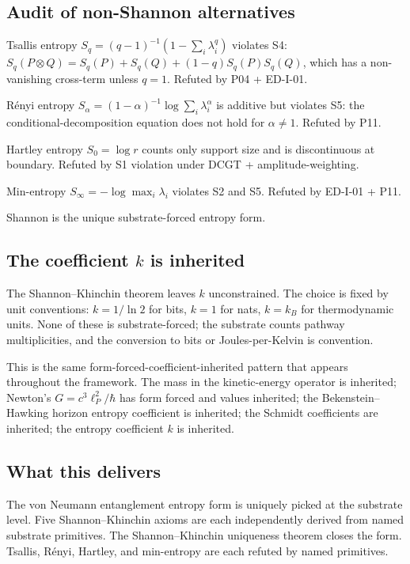 \documentclass[11pt,a4paper]{article}
\begin{document}
\subsection{Audit of non-Shannon alternatives}

Tsallis entropy $S_q = (q-1)^{-1}(1 - \sum_i \lambda_i^q)$ violates S4: $S_q(P \otimes Q) = S_q(P) + S_q(Q) + (1-q) S_q(P) S_q(Q)$, which has a non-vanishing cross-term unless $q = 1$. Refuted by P04 + ED-I-01.

R\'enyi entropy $S_\alpha = (1-\alpha)^{-1} \log \sum_i \lambda_i^\alpha$ is additive but violates S5: the conditional-decomposition equation does not hold for $\alpha \neq 1$. Refuted by P11.

Hartley entropy $S_0 = \log r$ counts only support size and is discontinuous at boundary. Refuted by S1 violation under DCGT + amplitude-weighting.

Min-entropy $S_\infty = -\log \max_i \lambda_i$ violates S2 and S5. Refuted by ED-I-01 + P11.

Shannon is the unique substrate-forced entropy form.

\subsection{The coefficient $k$ is inherited}

The Shannon--Khinchin theorem leaves $k$ unconstrained. The choice is fixed by unit conventions: $k = 1/\ln 2$ for bits, $k = 1$ for nats, $k = k_B$ for thermodynamic units. None of these is substrate-forced; the substrate counts pathway multiplicities, and the conversion to bits or Joules-per-Kelvin is convention.

This is the same form-forced-coefficient-inherited pattern that appears throughout the framework. The mass in the kinetic-energy operator is inherited; Newton's $G = c^3 \ell_P^2 / \hbar$ has form forced and values inherited; the Bekenstein--Hawking horizon entropy coefficient is inherited; the Schmidt coefficients are inherited; the entropy coefficient $k$ is inherited.

\subsection{What this delivers}

The von Neumann entanglement entropy form is uniquely picked at the substrate level. Five Shannon--Khinchin axioms are each independently derived from named substrate primitives. The Shannon--Khinchin uniqueness theorem closes the form. Tsallis, R\'enyi, Hartley, and min-entropy are each refuted by named primitives.
\end{document}
